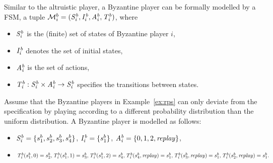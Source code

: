 Similar to the altruistic player, a Byzantine player can be formally modelled by a FSM, a tuple $\mathcal{M}^b_i=(\mathit{S^b_i}, \mathit{I^b_i}, \mathit{A^b_i}, \mathit{T^b_i})$, where
\begin{itemize}
\item $\mathit{S^b_i}$ is the (finite) set of states of Byzantine player $i$, 
\item $\mathit{I^b_i}$ denotes the set of initial states, 
\item $\mathit{A^b_i}$ is the set of actions, 
\item $\mathit{T^b_i}: \mathit{S^b_i} \times \mathit{A^b_i} \rightarrow \mathit{S^b_i}$ specifies the transitions between states.
\end{itemize}

Assume that the Byzantine players in Example~\ref{ex:rps} can only deviate from the specification by playing according to a different probability distribution than the uniform distribution. A Byzantine player is modelled as follows:
\begin{itemize}
\item
$\mathit{S^b_i}=\{s^b_1, s^b_2, s^b_3, s^b_4\}$, $\mathit{I^b_i}=\{s^b_1\}$, $\mathit{A^b_i}=\{0,1,2, \mathit{replay}\}$, 
\item
$\mathit{T^b_i}(s^b_1, 0) = s^b_2,
\mathit{T^b_i}(s^b_1, 1) = s^b_3,
\mathit{T^b_i}(s^b_1, 2) = s^b_4,\\
\mathit{T^b_i}(s^b_4,\mathit{replay})= s^b_1,
\mathit{T^b_i}(s^b_3,\mathit{replay})= s^b_1,\\ 
\mathit{T^b_i}(s^b_2,\mathit{replay})= s^b_1.$\\
\end{itemize}


